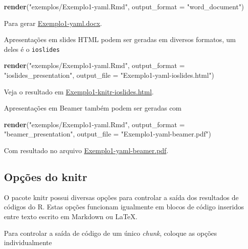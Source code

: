 \documentclass[10pt,a4paper]{book}
\newenvironment{Shaded}{\begin{snugshade}}{\end{snugshade}}
\newcommand{\KeywordTok}[1]{\textcolor[rgb]{0.13,0.29,0.53}{\textbf{#1}}}
\newcommand{\DataTypeTok}[1]{\textcolor[rgb]{0.13,0.29,0.53}{#1}}
\newcommand{\StringTok}[1]{\textcolor[rgb]{0.31,0.60,0.02}{#1}}
\newcommand{\NormalTok}[1]{#1}
\begin{document}
\begin{Shaded}
\begin{Highlighting}[]
\KeywordTok{render}\NormalTok{(}\StringTok{"exemplos/Exemplo1-yaml.Rmd"}\NormalTok{, }\DataTypeTok{output_format =} \StringTok{"word_document"}\NormalTok{)}
\end{Highlighting}
\end{Shaded}

Para gerar \href{exemplos/Exemplo1-knitr.docx}{Exemplo1-yaml.docx}.

Apresentações em slides HTML podem ser geradas em diversos formatos, um
deles é o \texttt{ioslides}

\begin{Shaded}
\begin{Highlighting}[]
\KeywordTok{render}\NormalTok{(}\StringTok{"exemplos/Exemplo1-yaml.Rmd"}\NormalTok{,}
       \DataTypeTok{output_format =} \StringTok{"ioslides_presentation"}\NormalTok{,}
       \DataTypeTok{output_file =} \StringTok{"Exemplo1-yaml-ioslides.html"}\NormalTok{)}
\end{Highlighting}
\end{Shaded}

Veja o resultado em
\href{exemplos/Exemplo1-knitr-ioslides.html}{Exemplo1-knitr-ioslides.html}.

Apresentações em Beamer também podem ser geradas com

\begin{Shaded}
\begin{Highlighting}[]
\KeywordTok{render}\NormalTok{(}\StringTok{"exemplos/Exemplo1-yaml.Rmd"}\NormalTok{,}
       \DataTypeTok{output_format =} \StringTok{"beamer_presentation"}\NormalTok{,}
       \DataTypeTok{output_file =} \StringTok{"Exemplo1-yaml-beamer.pdf"}\NormalTok{)}
\end{Highlighting}
\end{Shaded}

Com resultado no arquivo
\href{exemplos/Exemplo1-yaml-beamer.pdf}{Exemplo1-yaml-beamer.pdf}.

\subsection{Opções do knitr}\label{opcoes-do-knitr}

O pacote knitr possui diversas opções para controlar a saída dos
resultados de códigos do R. Estas opções funcionam igualmente em blocos
de código inseridos entre texto escrito em Markdown ou LaTeX.

Para controlar a saída de código de um único \emph{chunk}, coloque as
opções individualmente
\end{document}
